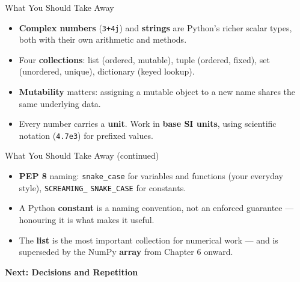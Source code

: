 \documentclass[9pt,aspectratio=169,xcolor=table]{beamer}
\begin{document}
\begin{frame}{What You Should Take Away}
    \leavevmode
    \small
    \begin{itemize}
        \item \textbf{Complex numbers} (\texttt{3+4j}) and
              \textbf{strings} are Python's richer scalar types, both
              with their own arithmetic and methods.
        \item Four \textbf{collections}: list (ordered, mutable), tuple
              (ordered, fixed), set (unordered, unique), dictionary
              (keyed lookup).
        \item \textbf{Mutability} matters: assigning a mutable object to
              a new name shares the same underlying data.
        \item Every number carries a \textbf{unit}. Work in \textbf{base
              SI units}, using scientific notation (\texttt{4.7e3}) for
              prefixed values.
    \end{itemize}
\end{frame}

\begin{frame}{What You Should Take Away (continued)}
    \leavevmode
    \small
    \begin{itemize}
        \item \textbf{PEP 8} naming: \texttt{snake\_case} for variables
              and functions (your everyday style), \texttt{SCREAMING\_}
              \texttt{SNAKE\_CASE} for constants.
        \item A Python \textbf{constant} is a naming convention, not an
              enforced guarantee --- honouring it is what makes it
              useful.
        \item The \textbf{list} is the most important collection for
              numerical work --- and is superseded by the NumPy
              \textbf{array} from Chapter 6 onward.
    \end{itemize}

    \vspace{4mm}
    \begin{center}
        \large\color{primary}\textbf{Next: Decisions and Repetition}
    \end{center}
\end{frame}
\end{document}
